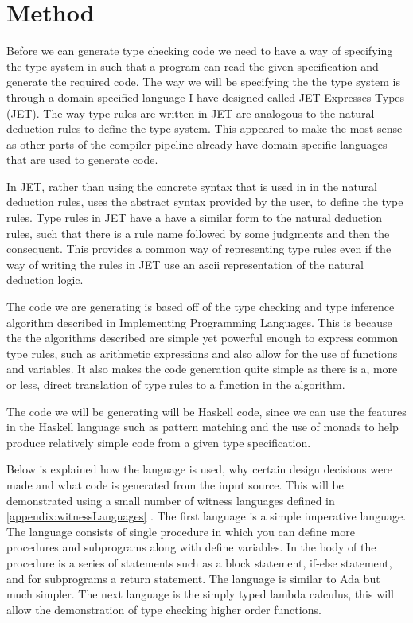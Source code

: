 \chapter{Method}
Before we can generate type checking code we need to have a way of specifying the type system in such that a program can read the given specification and generate the required code.
The way we will be specifying the the type system is through a domain specified language I have designed called JET Expresses Types (JET).
The way type rules are written in JET are analogous to the natural deduction rules to define the type system.
This appeared to make the most sense as other parts of the compiler pipeline already have domain specific languages that are used to generate code.

In JET, rather than using the concrete syntax that is used in in the natural deduction rules, uses the abstract syntax provided by the user, to define the type rules.
Type rules in JET have a have a similar form to the natural deduction rules, such that there is a rule name followed by some judgments and then the consequent.
This provides a common way of representing type rules even if the way of writing the rules in JET use an ascii representation of the natural deduction logic.

The code we are generating is based off of the type checking and type inference algorithm described in Implementing Programming Languages\cite{ranta2012implementing}.
This is because the the algorithms described are simple yet powerful enough to express common type rules, such as arithmetic expressions and also allow for the use of functions and variables.
It also makes the code generation quite simple as there is a, more or less, direct translation of type rules to a function in the algorithm.

The code we will be generating will be Haskell code, since we can use the features in the Haskell language such as pattern matching and the use of monads to help produce relatively simple code from a given type specification.

Below is explained how the language is used, why certain design decisions were made and what code is generated from the input source. 
This will be demonstrated using a small number of  witness languages defined in \autoref{appendix:witnessLanguages} .
The first language is a simple imperative language. 
The language consists of single procedure in which you can define more procedures and subprograms along with define variables. In the body of the procedure is a series of statements such as a block statement, if-else statement, and for subprograms a return statement. The language is similar to Ada but much simpler.
The next language is the simply typed lambda calculus, this will allow the demonstration of type checking higher order functions.


